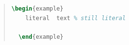 \begin{quote}
\begin{lstlisting}[language=TeX,frame=single]
\begin{example}
    literal  text % still literal

  \end{example}
\end{lstlisting} %
\end{quote}
